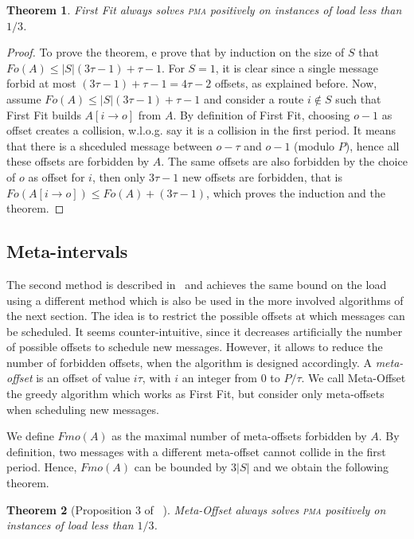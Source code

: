 \documentclass[10pt, conference, letterpaper]{IEEEtran}
\newtheorem{theorem}{Theorem}
\newcommand\pma{\textsc{pma}\xspace}
\begin{document}
\begin{theorem}
First Fit always solves \pma positively on instances of load less than $1/3$. 
\end{theorem}
\begin{proof}
To prove the theorem, e prove that by induction on the size of $S$ that $Fo(A) \leq |S|(3\tau -1) + \tau -1$.  For $S = 1$, it is clear since a single message forbid at most $(3\tau -1) + \tau -1 = 4\tau-2$ offsets, as explained before. Now, assume $Fo(A) \leq |S|(3\tau -1) + \tau -1$ and consider a route $i \notin S$ such that First Fit builds $A[i \rightarrow o]$ from $A$. By definition of First Fit, choosing $o-1$ as offset creates a collision, w.l.o.g. 
say it is a collision in the first period. It means that there is a shceduled message between $o - \tau $ and $o-1$ (modulo $P$), hence all these offsets are forbidden by $A$.
The same offsets are also forbidden by the choice of $o$ as offset for $i$, then only $3\tau -1$ new offsets are forbidden, that is $Fo(A[i \rightarrow o]) \leq Fo(A) + (3\tau -1)$,
which proves the induction and the theorem.
\end{proof}

\subsection{Meta-intervals}

The second method is described  in~\cite{barth2018deterministic} and achieves the same bound on the load using a different method which is also be used in the more involved algorithms
of the next section.
The idea is to restrict the possible offsets at which messages can be scheduled. It seems counter-intuitive, since it decreases artificially the number of possible offsets to schedule new messages. However, it allows to reduce the number of forbidden offsets, when the algorithm is designed accordingly. A \emph{meta-offset} is an offset of value $i\tau$,
with $i$ an integer from $0$ to $P / \tau$. We call Meta-Offset the greedy algorithm
which works as First Fit, but consider only meta-offsets when scheduling new messages. 

We define $Fmo(A)$ as the maximal number of meta-offsets forbidden by $A$. 
 By definition, two messages with a different meta-offset cannot collide in the first period.
Hence, $Fmo(A)$ can be bounded by $3|S|$ and we obtain the following theorem.


\begin{theorem}[Proposition 3 of~\cite{barth2018deterministic} ]
Meta-Offset always solves \pma positively on instances of load less than
$1/3$.
\end{theorem}
\end{document}
